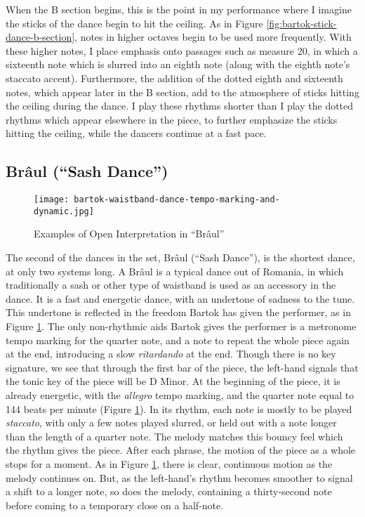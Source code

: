 When the B section begins, this is the point in my performance where I imagine the sticks of the dance begin to hit the ceiling. As in Figure \ref{fig:bartok-stick-dance-b-section}\autocite{Lung_2016}, notes in higher octaves begin to be used more frequently. With these higher notes, I place emphasis onto passages such as measure 20, in which a sixteenth note which is slurred into an eighth note (along with the eighth note's staccato accent). Furthermore, the addition of the dotted eighth and sixteenth notes, which appear later in the B section, add to the atmosphere of sticks hitting the ceiling during the dance. I play these rhythms shorter than I play the dotted rhythms which appear elsewhere in the piece, to further emphasize the sticks hitting the ceiling, while the dancers continue at a fast pace. 

\subsection{Brâul (``Sash Dance'')}

\begin{figure}
  \centering
  \texttt{[image: bartok-waistband-dance-tempo-marking-and-dynamic.jpg]}
  \caption[An example of the open interpretation in ``Brâul'' of Bartok's \textit{Six Romanian Folk Dances}, Sz. 56, BB 68]{Examples of Open Interpretation in ``Brâul''}
  \label{fig:bartok-waistband-dance-interpretation}
\end{figure}

The second of the dances in the set, Brâul (``Sash Dance''), is the shortest dance, at only two systems long. A Brâul is a typical dance out of Romania, in which traditionally a sash or other type of waistband is used as an accessory in the dance. It is a fast and energetic dance, with an undertone of sadness to the tune. This undertone is reflected in the freedom Bartok has given the performer, as in Figure \ref{fig:bartok-waistband-dance-interpretation}\autocite{Lung_2016}. The only non-rhythmic aids Bartok gives the performer is a metronome tempo marking for the quarter note, and a note to repeat the whole piece again at the end, introducing a slow \textit{ritardando} at the end. Though there is no key signature, we see that through the first bar of the piece, the left-hand signals that the tonic key of the piece will be D Minor. At the beginning of the piece, it is already energetic, with the \textit{allegro} tempo marking, and the quarter note equal to 144 beats per minute (Figure \ref{fig:bartok-waistband-dance-interpretation}\autocite{Lung_2016}). In its rhythm, each note is mostly to be played \textit{staccato}, with only a few notes played slurred, or held out with a note longer than the length of a quarter note. The melody matches this bouncy feel which the rhythm gives the piece. After each phrase, the motion of the piece as a whole stops for a moment. As in Figure \ref{fig:bartok-waistband-dance-interpretation}\autocite{Lung_2016}, there is clear, continuous motion as the melody continues on. But, as the left-hand's rhythm becomes smoother to signal a shift to a longer note, so does the melody, containing a thirty-second note before coming to a temporary close on a half-note. 

